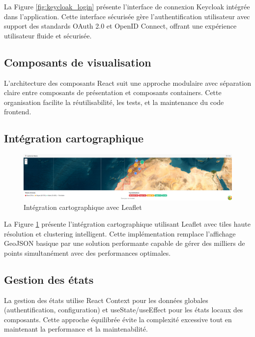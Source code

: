 La Figure \ref{fig:keycloak_login} présente l'interface de connexion Keycloak intégrée dans l'application. Cette interface sécurisée gère l'authentification utilisateur avec support des standards OAuth 2.0 et OpenID Connect, offrant une expérience utilisateur fluide et sécurisée.

\subsection{Composants de visualisation}

L'architecture des composants React suit une approche modulaire avec séparation claire entre composants de présentation et composants containers. Cette organisation facilite la réutilisabilité, les tests, et la maintenance du code frontend.

\subsection{Intégration cartographique}

\begin{figure}[H]
\centering
\includegraphics[width=1.0\textwidth]{images/leaflet_integration.png}
\caption{Intégration cartographique avec Leaflet}
\label{fig:leaflet_integration}
\end{figure}

La Figure \ref{fig:leaflet_integration} présente l'intégration cartographique utilisant Leaflet avec tiles haute résolution et clustering intelligent. Cette implémentation remplace l'affichage GeoJSON basique par une solution performante capable de gérer des milliers de points simultanément avec des performances optimales.

\subsection{Gestion des états}

La gestion des états utilise React Context pour les données globales (authentification, configuration) et useState/useEffect pour les états locaux des composants. Cette approche équilibrée évite la complexité excessive tout en maintenant la performance et la maintenabilité.

